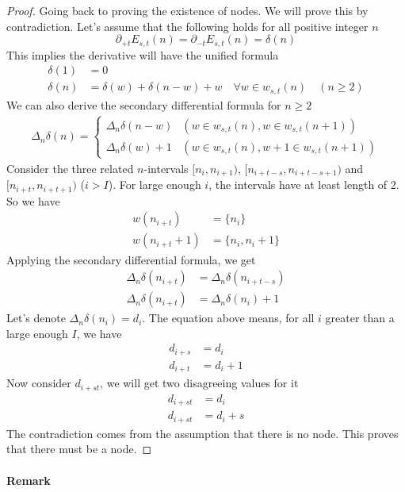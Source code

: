 \documentclass[]{article}
\begin{document}
\begin{proof}
	Going back to proving the existence of nodes. We will prove this by contradiction. Let's assume that the following holds for all positive integer $n$
	\[
	\partial_{+t}E_{s,t}(n) = \partial_{-t}E_{s,t}(n) = \delta(n)
	\]
	This implies the derivative will have the unified formula
	\begin{align*}
	\delta(1) &= 0\\
	\delta(n) &= \delta(w) + \delta(n-w) + w\quad \forall w\in w_{s,t}(n) \quad(n\geq 2)
	\end{align*}
	We can also derive the secondary differential formula for $n\geq 2$
	\begin{align*}
	\Delta_n \delta(n) =\begin{cases}
	\Delta_n  \delta(n-w) & (w\in w_{s,t}(n), w\in w_{s,t}(n+1) )\\
	\Delta_n  \delta(w) + 1 & (w\in w_{s,t}(n), w+1\in w_{s,t}(n+1) )
	\end{cases}
	\end{align*}
	Consider the three related $n$-intervals $[n_{i}, n_{i+1})$, $[n_{i + t-s}, n_{i + t-s + 1})$ and $[n_{i+t}, n_{i+t + 1})$ ($i > I$). For large enough $i$, the intervals have at least length of 2. So we have
	\begin{align*}
	w(n_{i+t}) &= \{n_{i}\}\\
	w(n_{i+t}+1) &= \{n_{i}, n_{i}+1\}
	\end{align*}
	Applying the secondary differential formula, we get
	\begin{align*}
	\Delta_n \delta(n_{i+t}) &= \Delta_n \delta(n_{i + t-s}) \\
	\Delta_n \delta(n_{i+t}) &= \Delta_n \delta(n_{i}) + 1
	\end{align*}
	Let's denote $\Delta_n \delta(n_i) = d_i$. The equation above means, for all $i$ greater than a large enough $I$, we have
	\begin{align*}
	d_{i+s} &= d_{i}\\
	d_{i+t} &= d_{i} + 1
	\end{align*}
	Now consider $d_{i+st}$, we will get two disagreeing values for it
	\begin{align*}
	d_{i+st} & = d_{i}\\
	d_{i+st} &= d_{i} + s
	\end{align*}
	The contradiction comes from the assumption that there is no node. This proves that there must be a node.

\end{proof}

\paragraph{Remark}
\end{document}
